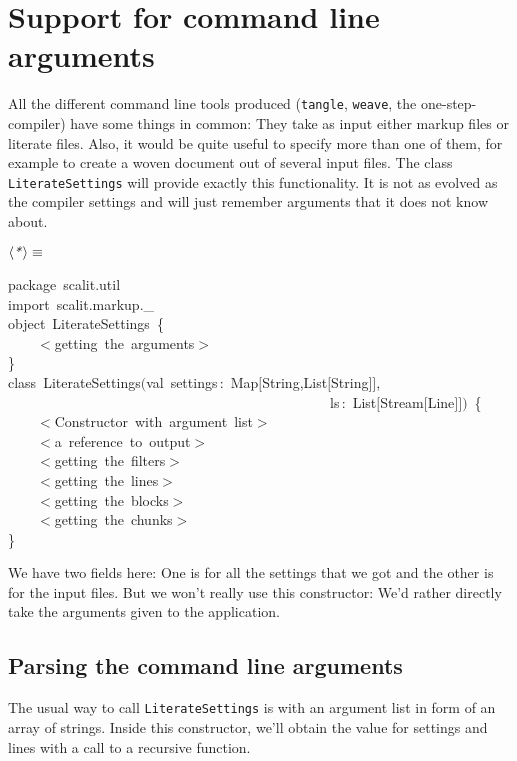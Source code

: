 \documentclass[a4paper,12pt]{article}
\begin{document}
\section{Support for command line arguments}
All the different command line tools produced (\texttt{tangle}, \texttt{weave},
the one-step-compiler) have some things in common: They take as input
either markup files or literate files. Also, it would be quite useful to
specify more than one of them, for example to create a woven document out of
several input files. The class \texttt{LiterateSettings} will provide exactly this
functionality. It is not as evolved as the compiler settings and will just
remember arguments that it does not know about.

$\left<\mbox{\emph{*}}\right>\equiv$
\begin{program}{\vem package}~scalit.util
\\{\vem import}~scalit.markup.\_
\\[0.5em]{\vem object}~LiterateSettings~{\small\{}
\\~~~~$<$getting~the~arguments$>$
\\{\small\}}
\\[0.5em]{\vem class}~LiterateSettings$(${\vem val}~settings\,{\rm :}~Map$[$String,List$[$String$]$$]$,
\\~~~~~~~~~~~~~~~~~~~~~~~~~~~~~~~~~~~~~~~~~~~~~~ls\,{\rm :}~List$[$Stream$[$Line$]$$]$$)$~{\small\{}
\\~~~~$<$Constructor~{\vem with}~argument~list$>$
\\[0.5em]~~~~$<$a~reference~to~output$>$
\\~~~~$<$getting~the~filters$>$
\\~~~~$<$getting~the~lines$>$
\\~~~~$<$getting~the~blocks$>$
\\~~~~$<$getting~the~chunks$>$
\\{\small\}}
\\[0.5em]\end{program}



We have two fields here: One is for all the settings that we got and
the other is for the input files. But we won't really use this constructor:
We'd rather directly take the arguments given to the application.

\subsection{Parsing the command line arguments}
The usual way to call \texttt{LiterateSettings} is with an argument list in
form of an array of strings. Inside this constructor, we'll obtain the
value for settings and lines with a call to a recursive function.
\end{document}
